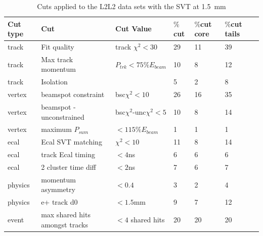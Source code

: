 \begin{table}[H]
\caption{Cuts applied to the L2L2 data sets with the SVT at 1.5~mm}
\label{l2l2_cuts_1p5}
\centering
\begin{tabular}{lllllll}
\toprule
Cut type & Cut & Cut Value &  $\%$cut &  $\%$cut core & $\%$cut tails\\
\midrule
track & Fit quality & track $\chi^{2}<30$ & 29 & 11 & 39 \\
track & Max track momentum &  $P_{trk}<75\%E_{beam}$ & 10 & 8 & 12 \\
track & Isolation &   & 5 & 2 & 8 \\
vertex & beamspot constraint & bsc$\chi^{2}<10$  & 26 & 16 & 35 \\
vertex & beamspot - unconstrained & bsc$\chi^{2}$-unc$\chi^2<5$  & 10 & 8 & 14 \\
vertex & maximum $P_{sum}$ &  $<115\%E_{beam}$ & 1 & 1 & 1 \\
ecal & Ecal SVT matching & $\chi^2<10$  & 11 & 8 & 14 \\
ecal & track Ecal timing & $<4$ns  & 6 & 6 & 6 \\
ecal & 2 cluster time diff & $<2$ns  & 7 & 6 & 7 \\
physics & momentum asymmetry & $<0.4$  & 3 & 2 & 4 \\
physics & e+ track d0 & $<1.5$mm  & 9 & 7 & 12 \\
event & max shared hits amongst tracks & $<4$ shared hits  & 20 & 20 & 20 \\
\bottomrule
\end{tabular}
\end{table}
